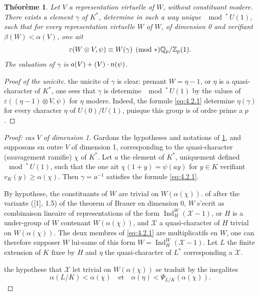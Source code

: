 \documentclass[12pt,a4paper]{article}
\theoremstyle{plain}
\newtheorem{theorem}{Th\'eor\`eme}[section]
\theoremstyle{definition}
\theoremstyle{remark}
\DeclareMathOperator{\Ind}{Ind}
\newcommand{\cX}{\mathcal{X}}
\newcommand{\bQ}{\mathbb{Q}}
\newcommand{\bZ}{\mathbb{Z}}
\let\dim\relax\let\det\relax
\providecommand{\cX}{\mathcal{X}}
\begin{document}
\begin{theorem}\label{thm:4.2}
Let $V$ a representation virtuelle of $W$, without constituant modere. There exists a element $\gamma$ of $K^*$, determine in such a way unique $\mod^*\, U(1)$, such that for every representation virtuelle $W$ of $W$, of dimension 0 and verifiant $\beta(W) < \alpha(V)$, one ait
\begin{equation}\label{eq:4.2.1}
\varepsilon(W \otimes V, \psi) \equiv \det W(\gamma) \pmod{*} \bQ_p/\bZ_p(1).
\end{equation}
The valuation of $\gamma$ is $a(V) + (\dim V) \cdot n(\psi)$.
\end{theorem}

\begin{proof}[Proof of the unicite]
the unicite of $\gamma$ is clear: prenant $W = \eta - 1$, or $\eta$ is a quasi-character of $K^*$, one sees that $\gamma$ is determine $\mod^*\, U(1)$ by the values of $\varepsilon((\eta-1) \otimes V, \psi)$ for $\eta$ modere. Indeed, the formule \eqref{eq:4.2.1} determine $\eta(\gamma)$ for every character $\eta$ of $U(0)/U(1)$, puisque this group is of ordre prime a $p$.
\end{proof}

\begin{proof}[Proof: cas $V$ of dimension 1]
Gardons the hypotheses and notations of \ref{thm:4.2}, and supposons en outre $V$ of dimension 1, corresponding to the quasi-character (sauvagement ramifie) $\chi$ of $K^*$. Let $a$ the element of $K^*$, uniquement defined $\mod^*\, U(1)$, such that the one ait $\chi(1+y) = \psi(ay)$ for $y \in K$ verifiant $v_K(y) \geq \alpha(\chi)$. Then $\gamma = a^{-1}$ satisfies the formule \eqref{eq:4.2.1}.

By hypothese, the constituants of $W$ are trivial on $W(\alpha(\chi))$. of after the variante ([1], 1.5) of the theorem of Brauer en dimension 0, $W$ s'ecrit as combinaison lineaire of representations of the form $\Ind_H^W(\cX - 1)$, or $H$ is a under-group of $W$ contenant $W(\alpha(\chi))$, and $\cX$ a quasi-character of $H$ trivial on $W(\alpha(\chi))$. The deux membres of \eqref{eq:4.2.1} are multiplicatifs en $W$, one can therefore supposer $W$ lui-same of this form $W = \Ind_H^W(\cX - 1)$. Let $L$ the finite extension of $K$ fixee by $H$ and $\eta$ the quasi-character of $L^*$ corresponding a $\cX$.

the hypothese that $\cX$ let trivial on $W(\alpha(\chi))$ se traduit by the inegalites
\[
\alpha(L/K) < \alpha(\chi) \quad \text{et} \quad \alpha(\eta) < \Psi_{L/K}(\alpha(\chi)).
\]
\end{proof}
\end{document}
